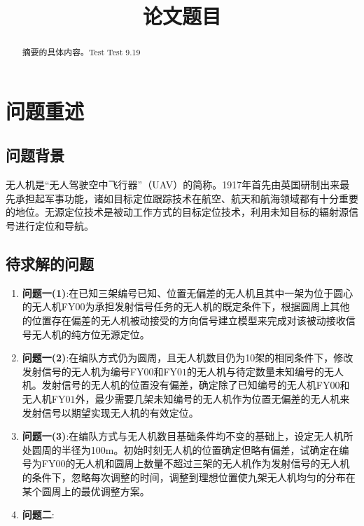 \documentclass[withoutpreface,bwprint]{cumcmthesis} %
\title{论文题目}
\begin{document}
	\maketitle
	\begin{abstract}
		摘要的具体内容。Test Test 9.19
	\end{abstract}
	
	
		\section{问题重述}
		\subsection{问题背景}
		\par 无人机是“无人驾驶空中飞行器”（UAV）的简称。1917年首先由英国研制出来最先承担起军事功能，诸如目标定位跟踪技术在航空、航天和航海领域都有十分重要的地位。无源定位技术是被动工作方式的目标定位技术，利用未知目标的辐射源信号进行定位和导航。
		\subsection{待求解的问题}
		\par 
		\begin{enumerate}
			\item{\textbf{问题一(1)}:}在已知三架编号已知、位置无偏差的无人机且其中一架为位于圆心的无人机FY$ 00 $为承担发射信号任务的无人机的既定条件下，根据圆周上其他的位置存在偏差的无人机被动接受的方向信号建立模型来完成对该被动接收信号无人机的纯方位无源定位。
			\item{\textbf{问题一(2)}:}在编队方式仍为圆周，且无人机数目仍为10架的相同条件下，修改发射信号的无人机为编号FY$ 00 $和FY$ 01 $的无人机与待定数量未知编号的无人机。发射信号的无人机的位置没有偏差，确定除了已知编号的无人机FY$ 00 $和无人机FY$ 01 $外，最少需要几架未知编号的无人机作为位置无偏差的无人机来发射信号以期望实现无人机的有效定位。
			\item{\textbf{问题一(3)}:}在编队方式与无人机数目基础条件均不变的基础上，设定无人机所处圆周的半径为100m。初始时刻无人机的位置确定但略有偏差，试确定在编号为FY$ 00 $的无人机和圆周上数量不超过三架的无人机作为发射信号的无人机的条件下，忽略每次调整的时间，调整到理想位置使九架无人机均匀的分布在某个圆周上的最优调整方案。
			\item{\textbf{问题二}:}
		\end{enumerate}
\end{document}
